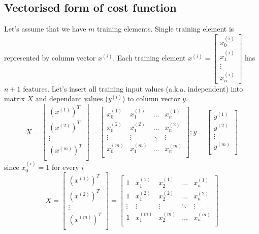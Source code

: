 \documentclass{article} %
\begin{document}
\subsection{Vectorised form of cost function}
Let's assume that we have $m$ training elements. 
\newline
Single training element is represented by column vector $x^{(i)}$.
\newline 
Each training element $x^{(i)}=\begin{bmatrix}x^{(i)}_0\\ x^{(i)}_1\\ \vdots \\ x^{(i)}_n\end{bmatrix}$ has $n+1$ features.
\newline
\newline
Let's insert all training input values (a.k.a. independent) into matrix $X$ and dependant values ($y^{(i)}$) to column vector $y$.
\begin{equation*}
X = 
\begin{bmatrix} 
(x^{(1)})^T \\ 
(x^{(2)})^T \\
\vdots \\
(x^{(m)})^T \\
\end{bmatrix} =
\begin{bmatrix} 
x^{(1)}_0 	& x^{(1)}_1 	& \dots 	& x^{(1)}_n \\ 
x^{(2)}_0 	& x^{(2)}_1 	& \dots 	& x^{(2)}_n \\
\vdots 	& \vdots 		& \ddots	& \vdots \\
x^{(m)}_0 	& x^{(m)}_1 	& \dots 	& x^{(m)}_n \\
\end{bmatrix} ; 
y = 
\begin{bmatrix} 
y^{(1)} \\ 
y^{(2)} \\
\vdots \\
y^{(m)} \\
\end{bmatrix}
\end{equation*}
since $x^{(i)}_0 = 1$ for every $i$
\begin{equation*}
X = 
\begin{bmatrix} 
(x^{(1)})^T \\ 
(x^{(2)})^T \\
\vdots \\
(x^{(m)})^T \\
\end{bmatrix} =
\begin{bmatrix} 
1 	& x^{(1)}_1	& x^{(1)}_2 	& \dots 	& x^{(1)}_n \\ 
1 	& x^{(2)}_1 	& x^{(2)}_2	& \dots 	& x^{(2)}_n \\
\vdots 	& \vdots 	& \vdots		& \ddots	& \vdots \\
1 	& x^{(m)}_1 	& x^{(m)}_2	& \dots 	& x^{(m)}_n \\
\end{bmatrix} 
\end{equation*}
\end{document}
